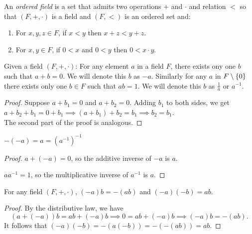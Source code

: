 \begin{defn} \label{defn:ordered_field}
    An \emph{ordered field} is a set that admits two operations $+$ and $\cdot$ and relation $<$ so that $(F, +, \cdot)$ is a field and $(F, <)$ is an ordered set and:
    \begin{enumerate}[label=(O\arabic*)]
        \setcounter{enumi}{\value{temp}}
        \item \label{defn:order:sum}
            For $x, y, z \in F$, if $x < y$ then $x + z < y + z$.
        \item \label{defn:order:product}
            For $x, y \in F$, if $0 < x$ and $0 < y$ then $0 < x \cdot y$.
    \end{enumerate}
\end{defn}

\begin{lem} \label{thm:field:unique_inverses}
    Given a field $(F, +, \cdot)$: For any element $a$ in a field $F$, there exists ony one $b$ such that $a + b = 0$. We will denote this $b$ as $-a$. Similarly for any $a$ in $F \setminus \set{0}$ there exists only one $b \in F$ such that $ab = 1$. We will denote this $b$ as $\frac{1}{a}$ or $a^{-1}$.
\end{lem}
\begin{proof}
    Suppose $a + b_{1} = 0$ and $a + b_{2} = 0$. Adding $b_{1}$ to both sides, we get $a + b_{2} + b_{1} = 0 + b_{1} \implies (a + b_{1}) + b_{2} = b_{1} \implies b_{2} = b_{1}$. \\
    The second part of the proof is analogous.
\end{proof}

\begin{lem} \label{thm:field:inverse_involution}
    $-(-a) = a = (a^{-1})^{-1}$
\end{lem}
\begin{proof}
    $a + (-a) = 0$, so the additive inverse of $-a$ is $a$.

    $aa^{-1} = 1$, so the multiplicative inverse of $a^{-1}$ is $a$.
\end{proof}

\begin{lem} \label{thm:field:negative_product}
    For any field $(F, +, \cdot)$, $(-a)b = -(ab)$ and $(-a)(-b) = ab$.
\end{lem}
\begin{proof}
    By the distributive law, we have \[
        (a + (-a))b = ab + (-a)b \implies 0 = ab + (-a)b \implies (-a)b = -(ab).
    \]
    It follows that $(-a)(-b) = -(a(-b)) = -(-(ab)) = ab$.
\end{proof}

